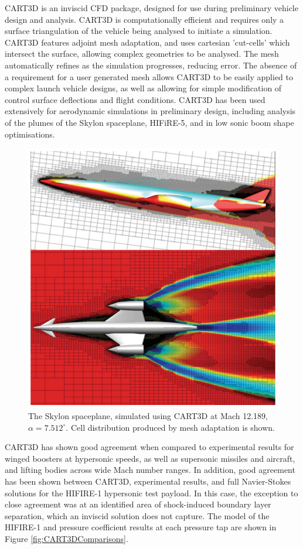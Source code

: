 CART3D is an inviscid CFD package, designed for use during preliminary vehicle design and analysis\cite{Almosnino2016}. CART3D is computationally efficient and requires only a surface triangulation of the vehicle being analysed to initiate a simulation. CART3D features adjoint mesh adaptation, and uses cartesian 'cut-cells' which intersect the surface, allowing complex geometries to be analysed. The mesh automatically refines as the simulation progresses, reducing error. The absence of a requirement for a user generated mesh allows CART3D to be easily applied to complex launch vehicle designs, as well as allowing for simple modification of control surface deflections and flight conditions. 
CART3D has been used extensively for aerodynamic simulations in preliminary design, including analysis of the plumes of the Skylon spaceplane\cite{Mehta2016}, HIFiRE-5\cite{Kimmel2010}, and in low sonic boom shape optimisations\cite{Aftosmis2011}. 
\begin{figure}[ht]
\centering
\includegraphics[width=0.6\linewidth]{figures/2_literature-review/Skylon-CART3D}
\caption{The Skylon spaceplane, simulated using CART3D at Mach 12.189, $\alpha=7.512^\circ$\cite{Mehta2016}. Cell distribution produced by mesh adaptation is shown.}
\label{fig:Skylon-CART3D}
\end{figure}
CART3D has shown good agreement when compared to experimental results for winged boosters at hypersonic speeds\cite{Sagerman2017}, as well as supersonic missiles\cite{Abeynayake} and aircraft\cite{Aftosmis2011}, and lifting bodies across wide Mach number ranges\cite{Almosnino2016a}.
In addition, good agreement has been shown between CART3D, experimental results, and full Navier-Stokes solutions for the HIFIRE-1 hypersonic test payload\cite{Sagerman2017}. In this case, the exception to close agreement was at an identified area of shock-induced boundary layer separation, which an inviscid solution does not capture\cite{Sagerman2017}. The model of the HIFIRE-1 and pressure coefficient results at each pressure tap are shown in Figure \ref{fig:CART3DComparisons}. 
